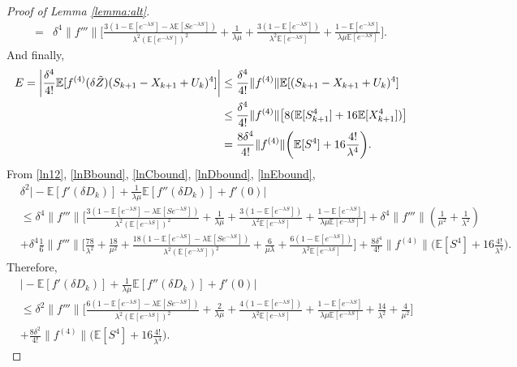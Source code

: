\documentclass[11pt,letterpaper,reqno]{article}
\theoremstyle{thmstyleone}%
\theoremstyle{thmstyletwo}%
\theoremstyle{thmstylethree}%
\numberwithin{equation}{section}
\begin{document}
\begin{proof}[Proof of Lemma \ref{lemma:alt}]
\begin{align}
    =& \delta^4 \|f'''\|\bigg[\frac{3\left(1 - \mathbb E[e^{-\lambda S}] - \lambda \mathbb E[S e^{-\lambda S}]\right)}{\lambda^2 (\mathbb E[e^{-\lambda S}])^2}+\frac{1}{\lambda \mu} +\frac{3(1-\mathbb E[e^{-\lambda S}])}{\lambda^2\mathbb E[e^{-\lambda S}]}+\frac{1-\mathbb E[e^{-\lambda S}]}{\lambda\mu \mathbb E[e^{-\lambda S}]}\bigg].
\end{align}
And finally,
\begin{align}\label{lnEbound}
   E= \bigg|\frac{\delta^4}{4!}\mathbb E[f^{(4)}(\delta \Tilde{Z})(S_{k+1}-X_{k+1}+U_k)^4] \bigg| &\leq \frac{\delta^4}{4!} \|f^{(4)}\|\mathbb E[(S_{k+1}-X_{k+1}+U_k)^4] \nonumber\\
   & \leq \frac{\delta^4}{4!} \|f^{(4)}\| \big[ 8 (\mathbb E[S_{k+1}^4]+16\mathbb E[X_{k+1}^4])\big] \nonumber\\
   &=\frac{8\delta^4}{4!} \|f^{(4)}\| \bigg(\mathbb E[S^4] +16\frac{4!}{\lambda^4}\bigg).
\end{align}
From \eqref{ln12}, \eqref{lnBbound}, \eqref{lnCbound}, \eqref{lnDbound}, \eqref{lnEbound},
\begin{align*}
     &\delta^2\bigg|- \mathbb E[f'(\delta D_k)]+\frac{1}{\lambda \mu} \mathbb E[f''(\delta D_k)]+f'(0)\bigg| \nonumber\\
    &\leq \delta^4 \|f'''\|\bigg[\frac{3\left(1 - \mathbb E[e^{-\lambda S}] - \lambda \mathbb E[S e^{-\lambda S}]\right)}{\lambda^2 (\mathbb E[e^{-\lambda S}])^2}+\frac{1}{\lambda \mu} +\frac{3(1-\mathbb E[e^{-\lambda S}])}{\lambda^2\mathbb E[e^{-\lambda S}]}+\frac{1-\mathbb E[e^{-\lambda S}]}{\lambda\mu \mathbb E[e^{-\lambda S}]}\bigg]+\delta^4 \|f'''\|\left(\frac{1}{\mu^2}+\frac{1}{\lambda^2}\right)\\  
    &+ \delta^4 \frac{1}{6}\| f'''\|\bigg[\frac{78}{\lambda^2}+\frac{18}{\mu^2} + \frac{18\left(1 - \mathbb E[e^{-\lambda S}] - \lambda \mathbb E[S e^{-\lambda S}]\right)}{\lambda^2 (\mathbb E[e^{-\lambda S}])^2} + \frac{6}{\mu \lambda}+\frac{6(1-\mathbb E[e^{-\lambda S}])}{\lambda^2\mathbb E[e^{-\lambda S}]}\bigg]+\frac{8\delta^4}{4!} \|f^{(4)}\| \bigg(\mathbb E[S^4] +16\frac{4!}{\lambda^4}\bigg).
\end{align*}
Therefore,
\begin{align*}
    &\bigg|- \mathbb E[f'(\delta D_k)]+\frac{1}{\lambda \mu} \mathbb E[f''(\delta D_k)]+f'(0)\bigg| \nonumber\\
    &\leq \delta^2 \|f'''\| \bigg[\frac{6\left(1 - \mathbb E[e^{-\lambda S}] - \lambda \mathbb E[S e^{-\lambda S}]\right)}{\lambda^2 (\mathbb E[e^{-\lambda S}])^2}+\frac{2}{\lambda \mu} +\frac{4(1-\mathbb E[e^{-\lambda S}])}{\lambda^2\mathbb E[e^{-\lambda S}]}+\frac{1-\mathbb E[e^{-\lambda S}]}{\lambda\mu \mathbb E[e^{-\lambda S}]}+\frac{14}{\lambda^2}+\frac{4}{\mu^2} \bigg]\\
    &+\frac{8\delta^2}{4!} \|f^{(4)}\| \bigg(\mathbb E[S^4] +16\frac{4!}{\lambda^4}\bigg).
\end{align*}
\end{proof}
\end{document}
